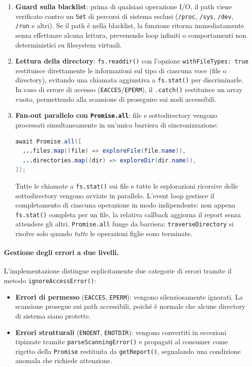 \documentclass[11pt,a4paper]{article}
\begin{document}
\begin{enumerate}
    \item \textbf{Guard sulla blacklist}: prima di qualsiasi operazione I/O, il path viene verificato contro un \texttt{Set} di percorsi di sistema esclusi (\texttt{/proc}, \texttt{/sys}, \texttt{/dev}, \texttt{/run} e altri). Se il path è nella blacklist, la funzione ritorna immediatamente senza effettuare alcuna lettura, prevenendo loop infiniti o comportamenti non deterministici su filesystem virtuali.

    \item \textbf{Lettura della directory}: \texttt{fs.readdir()} con l'opzione \texttt{withFileTypes: true} restituisce direttamente le informazioni sul tipo di ciascuna voce (file o directory), evitando una chiamata aggiuntiva a \texttt{fs.stat()} per discriminarle. In caso di errore di accesso (\texttt{EACCES}/\texttt{EPERM}), il \texttt{.catch()} restituisce un array vuoto, permettendo alla scansione di proseguire sui nodi accessibili.

    \item \textbf{Fan-out parallelo con \texttt{Promise.all}}: file e sottodirectory vengono processati simultaneamente in un'unica barriera di sincronizzazione:
\begin{lstlisting}[language=Java]
await Promise.all([
  ...files.map((file) => exploreFile(file.name)),
  ...directories.map((dir) => exploreDir(dir.name)),
]);
\end{lstlisting}
    Tutte le chiamate a \texttt{fs.stat()} sui file e tutte le esplorazioni ricorsive delle sottodirectory vengono avviate in parallelo. L'event loop gestisce il completamento di ciascuna operazione in modo indipendente: non appena \texttt{fs.stat()} completa per un file, la relativa callback aggiorna il report senza attendere gli altri. \texttt{Promise.all} funge da barriera: \texttt{traverseDirectory} si risolve solo quando \textit{tutte} le operazioni figlie sono terminate.
\end{enumerate}

\paragraph{Gestione degli errori a due livelli.}

L'implementazione distingue esplicitamente due categorie di errori tramite il metodo \texttt{ignoreAccessError()}:

\begin{itemize}
    \item \textbf{Errori di permesso} (\texttt{EACCES}, \texttt{EPERM}): vengono silenziosamente ignorati. La scansione prosegue sui path accessibili, poiché è normale che alcune directory di sistema siano protette.
    \item \textbf{Errori strutturali} (\texttt{ENOENT}, \texttt{ENOTDIR}): vengono convertiti in eccezioni tipizzate tramite \texttt{parseScanningError()} e propagati al consumer come rigetto della \texttt{Promise} restituita da \texttt{getReport()}, segnalando una condizione anomala che richiede attenzione.
\end{itemize}
\end{document}
